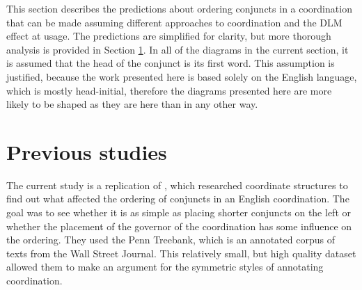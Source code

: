 
This section describes the predictions about ordering conjuncts in a coordination that can be made assuming different approaches to coordination and the DLM effect at usage. The predictions are simplified for clarity, but more thorough analysis is provided in Section \ref{sec:previous}. In all of the diagrams in the current section, it is assumed that the head of the conjunct is its first word. This assumption is justified, because the work presented here is based solely on the English language, which is mostly head-initial, therefore the diagrams presented here are more likely to be shaped as they are here than in any other way.







\section{Previous studies}\label{sec:previous}
The current study is a replication of \cite{prz:woz:23}, which researched coordinate structures to find out what affected the ordering of conjuncts in an English coordination. The goal was to see whether it is as simple as placing shorter conjuncts on the left or whether the placement of the governor of the coordination has some influence on the ordering. They used the Penn Treebank, which is an annotated corpus of texts from the Wall Street Journal. This relatively small, but high quality dataset allowed them to make an argument for the symmetric styles of annotating coordination. 

